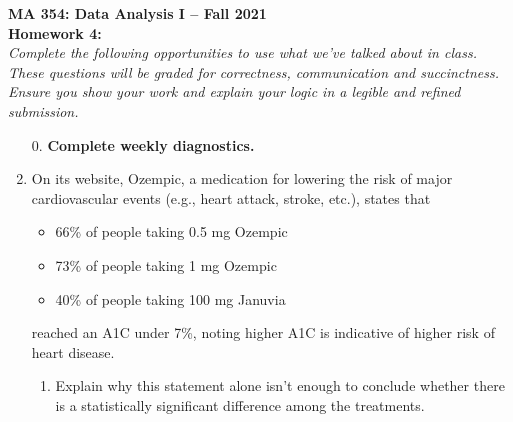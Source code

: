 \documentclass{article}\usepackage[]{graphicx}\usepackage[]{color}
\begin{document}
\noindent \textbf{MA 354: Data Analysis I -- Fall 2021}\\%
\noindent \textbf{Homework 4:}\vspace{1em}\\
\emph{Complete the following opportunities to use what we've talked about in class. 
These questions will be graded for correctness, communication and succinctness. 
Ensure you show your work and explain your logic in a legible and refined submission.}
\begin{enumerate}
\item[0.] \textbf{Complete weekly diagnostics.}
  
\item On its website, Ozempic, a medication for lowering the risk of major cardiovascular 
events (e.g., heart attack, stroke, etc.), states that 
\begin{itemize}
  \item 66\% of people taking 0.5 mg Ozempic
  \item 73\% of people taking 1 mg Ozempic
  \item 40\% of people taking 100 mg Januvia
\end{itemize}
reached an A1C under 7\%, noting higher A1C is indicative of higher risk of heart disease.

\begin{enumerate}
\item Explain why this statement alone isn't enough to conclude whether there is a statistically 
significant difference among the treatments.


\end{enumerate}
\end{enumerate}
\end{document}
